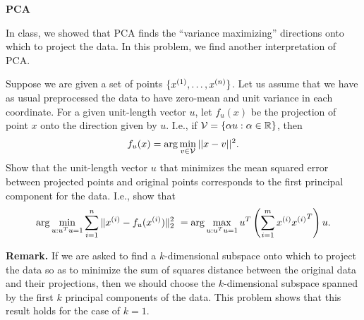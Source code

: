 \item {} {\bf PCA} 

In class, we showed that PCA finds the ``variance maximizing'' directions onto
which to project the data.  In this problem, we find another interpretation of PCA. 

Suppose we are given a set of points $\{x^{(1)},\ldots,x^{(\nexp)}\}$. Let us
assume that we have as usual preprocessed the data to have zero-mean and unit variance
in each coordinate.  For a given unit-length vector $u$, let $f_u(x)$ be the 
projection of point $x$ onto the direction given by $u$.  I.e., if 
${\cal V} = \{\alpha u : \alpha \in \Re\}$, then 
\[
f_u(x) = \arg \min_{v\in {\cal V}} ||x-v||^2.
\]
Show that the unit-length vector $u$ that minimizes the 
mean squared error between projected points and original points corresponds
to the first principal component for the data. I.e., show that
$$ \arg \min_{u:u^Tu=1} \sum_{i=1}^\nexp \|x^{(i)}-f_u(x^{(i)})\|_2^2 \ = \arg\max_{u:u^Tu=1} u^T \left(\sum_{i=1}^m \xsi{\xsi}^T \right) u.$$

{\bf Remark.} If we are asked to find a $k$-dimensional subspace onto which to
project the data so as to minimize the sum of squares distance between the
original data and their projections, then we should choose the $k$-dimensional
subspace spanned by the first $k$ principal components of the data.  This problem
shows that this result holds for the case of $k=1$.

\ifnum{} {
  
} \fi

  
